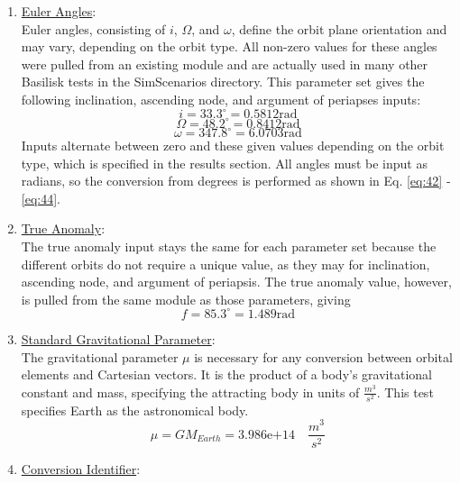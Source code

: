 \begin{enumerate}
	\item \underline{Euler Angles}:\\
	Euler angles, consisting of $i$, $\Omega$, and $\omega$, define the orbit plane orientation and may vary, depending on the orbit type. All non-zero values for these angles were pulled from an existing module and are actually used in many other Basilisk tests in the SimScenarios directory. This parameter set gives the following inclination, ascending node, and argument of periapses inputs:
	\begin{equation}\label{eq:42}
		i = 33.3^{\circ} = 0.5812 \text{rad}
	\end{equation}
	\begin{equation}\label{eq:43}
		\Omega = 48.2^{\circ} = 0.8412 \text{rad}
	\end{equation}
	\begin{equation}\label{eq:44}
		\omega = 347.8^{\circ} = 6.0703 \text{rad}
	\end{equation}
	Inputs alternate between zero and these given values depending on the orbit type, which is specified in the results section. All angles must be input as radians, so the conversion from degrees is performed as shown in Eq. \ref{eq:42} - \ref{eq:44}.
	\item \underline{True Anomaly}:\\
	The true anomaly input stays the same for each parameter set because the different orbits do not require a unique value, as they may for inclination, ascending node, and argument of periapsis. The true anomaly value, however, is pulled from the same module as those parameters, giving 
	\begin{equation} \label{eq:41}
		f = 85.3^\circ = 1.489 \text{rad}
	\end{equation}
	\item \underline{Standard Gravitational Parameter}:\\
	The gravitational parameter $\mu$ is necessary for any conversion between orbital elements and Cartesian vectors. It is the product of a body's gravitational constant and mass, specifying the attracting body in units of $\frac{m^3}{s^2}$. This test specifies Earth as the astronomical body.
	\begin{equation}
		\mu = GM_{Earth}=3.986 \text{e+} 14\quad \frac{m^3}{s^2}
	\end{equation}
	\item \underline{Conversion Identifier}:\\

\end{enumerate}
